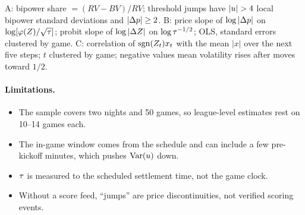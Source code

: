 \begin{table}[t]
\begin{threeparttable}
\begin{tablenotes}[flushleft]
\item A: bipower share $=(RV-BV)/RV$; threshold jumps have $|\ustd|>4$ local bipower standard deviations and $|\Delta p|\ge2$\cents. B: price slope of $\log|\Delta p|$ on $\log[\varphi(Z)/\sqrt{\tau}]$; probit slope of $\log|\Delta Z|$ on $\log\tau^{-1/2}$; OLS, standard errors clustered by game. C: correlation of $\operatorname{sgn}(Z_t)x_t$ with the mean $|x|$ over the next five steps; $t$ clustered by game; negative values mean volatility rises after moves toward $1/2$.
\end{tablenotes}
\end{threeparttable}
\end{table}

\paragraph{Limitations.}
\begin{itemize}
\item The sample covers two nights and 50 games, so league-level estimates rest on 10--14 games
  each.
\item The in-game window comes from the schedule and can include a few pre-kickoff minutes, which
  pushes $\operatorname{Var}(u)$ down.
\item $\tau$ is measured to the scheduled settlement time, not the game clock.
\item Without a score feed, ``jumps'' are price discontinuities, not verified scoring events.
\end{itemize}
